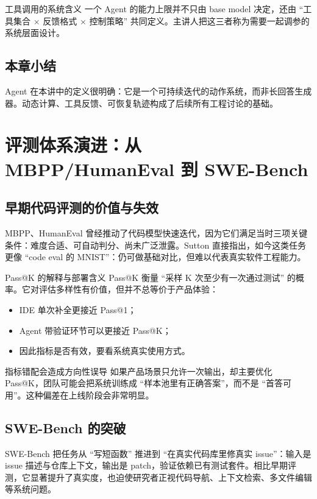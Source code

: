 \documentclass[a4paper]{article}
\begin{document}
\begin{importantbox}{工具调用的系统含义}
一个 Agent 的能力上限并不只由 base model 决定，还由 ``工具集合 $\times$ 反馈格式 $\times$ 控制策略'' 共同定义。主讲人把这三者称为需要一起调参的系统层面设计。
\end{importantbox}

\subsection{本章小结}
Agent 在本讲中的定义很明确：它是一个可持续迭代的动作系统，而非长回答生成器。动态计算、工具反馈、可恢复轨迹构成了后续所有工程讨论的基础。

\section{评测体系演进：从 MBPP/HumanEval 到 SWE-Bench}

\subsection{早期代码评测的价值与失效}
MBPP、HumanEval 曾经推动了代码模型快速迭代，因为它们满足当时三项关键条件：难度合适、可自动判分、尚未广泛泄露。Sutton 直接指出，如今这类任务更像 ``code eval 的 MNIST''：仍可做基础对比，但难以代表真实软件工程能力。

\begin{knowledgebox}{Pass@K 的解释与部署含义}
Pass@K 衡量 ``采样 K 次至少有一次通过测试'' 的概率。它对评估多样性有价值，但并不总等价于产品体验：
\begin{itemize}
    \item IDE 单次补全更接近 Pass@1；
    \item Agent 带验证环节可以更接近 Pass@K；
    \item 因此指标是否有效，要看系统真实使用方式。
\end{itemize}
\end{knowledgebox}

\begin{warningbox}{指标错配会造成方向性误导}
如果产品场景只允许一次输出，却主要优化 Pass@K，团队可能会把系统训练成 ``样本池里有正确答案''，而不是 ``首答可用''。这种偏差在上线阶段会非常明显。
\end{warningbox}

\subsection{SWE-Bench 的突破}
SWE-Bench 把任务从 ``写短函数'' 推进到 ``在真实代码库里修真实 issue''：输入是 issue 描述与仓库上下文，输出是 patch，验证依赖已有测试套件。相比早期评测，它显著提升了真实度，也迫使研究者正视代码导航、上下文检索、多文件编辑等系统问题。
\end{document}
